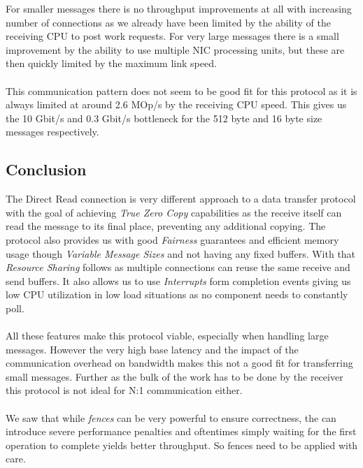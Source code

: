 For smaller messages there is no throughput improvements at all with increasing number of connections as we already have 
been limited by the ability of the receiving CPU to post work requests. For very large messages there is a small improvement 
by the ability to use multiple NIC processing units, but these are then quickly limited by the maximum link speed.

\paragraph{} This communication pattern does not seem to be good fit for this protocol as it is always limited at around 
2.6 MOp/s by the receiving CPU speed. This gives us the 10 Gbit/s and 0.3 Gbit/s bottleneck for the 512 byte and 16 byte size
messages respectively.

\subsection{Conclusion}

The Direct Read connection is very different approach to a data transfer protocol with the goal of achieving 
\emph{True Zero Copy} capabilities as the receive itself can read the message to its final place, preventing any additional 
copying. The protocol also provides us with good \emph{Fairness} guarantees and efficient memory usage though 
\emph{Variable Message Sizes} and not having any fixed buffers. With that \emph{Resource Sharing} follows as multiple
connections can reuse the same receive and send buffers. It also allows us to use \emph{Interrupts} form completion events
giving us low CPU utilization in low load situations as no component needs to constantly poll.

\paragraph{} All these features make this protocol viable, especially when handling large messages. However the very high
base latency and the impact of the communication overhead on bandwidth makes this not a good fit for transferring small 
messages. Further as the bulk of the work has to be done by the receiver this protocol is not ideal for N:1 communication
either.

\paragraph{} We saw that while \emph{fences} can be very powerful to ensure correctness, the can introduce severe performance
penalties and oftentimes simply waiting for the first operation to complete yields better throughput. So fences need to be
applied with care.

